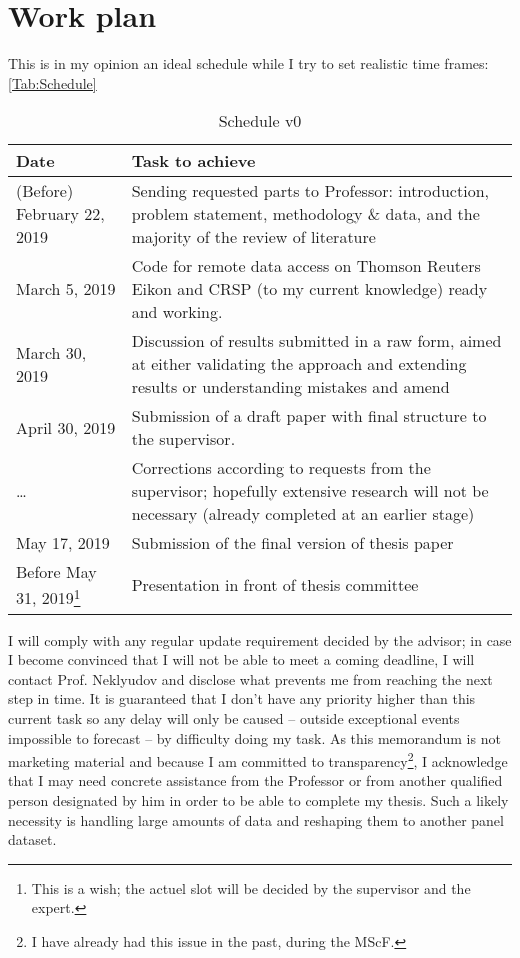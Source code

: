 \documentclass[a4paper, twoside, listof=totoc, toc=sectionentrywithdots]{scrartcl}
\begin{document}
\section{Work plan}
This is in my opinion an ideal schedule while I try to set realistic time frames: \autoref{Tab:Schedule}
\begin{center}
  \begin{table}
    \caption{Schedule v0}
    \label{Tab:Schedule}
  \begin{tabular}{p{}p{}}
    \toprule
    Date & Task to achieve\\
    \midrule
    (Before) February 22, 2019 & Sending requested parts to Professor: introduction, problem statement, methodology \& data, and the majority of the review of literature\\
    March 5, 2019 & Code for remote data access on Thomson Reuters Eikon and CRSP (to my current knowledge) ready and working.\\
    March 30, 2019 & Discussion of results submitted in a raw form, aimed at either validating the approach and extending results or understanding mistakes and amend\\
    April 30, 2019 & Submission of a draft paper with final structure to the supervisor.\\
    \dots & Corrections according to requests from the supervisor; hopefully extensive research will not be necessary (already completed at an earlier stage)\\
    May 17, 2019 & Submission of the final version of thesis paper\\
    Before May 31, 2019\footnote{This is a wish; the actuel slot will be decided by the supervisor and the expert.} & Presentation in front of thesis committee\\
    \bottomrule
    \end{tabular}
  \end{table}
\end{center}
I will comply with any regular update requirement decided by the advisor; in case I become convinced that I will not be able to meet a coming deadline, I will contact Prof. Neklyudov and disclose what prevents me from reaching the next step in time. It is guaranteed that I don't have any priority higher than this current task so any delay will only be caused -- outside exceptional events impossible to forecast -- by difficulty doing my task. As this memorandum is not marketing material and because I am committed to transparency\footnote{I have already had this issue in the past, during the MScF.}, I acknowledge that I may need concrete assistance from the Professor or from another qualified person designated by him in order to be able to complete my thesis. Such a likely necessity is handling large amounts of data and reshaping them to another panel dataset.
\clearpage
\printbibliography
\end{document}
